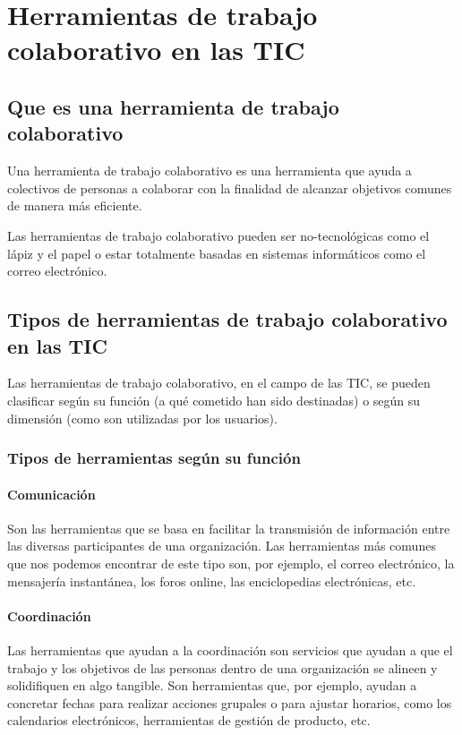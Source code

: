 \section{Herramientas de trabajo colaborativo en las TIC}

\subsection{Que es una herramienta de trabajo colaborativo}

Una herramienta de trabajo colaborativo es una herramienta que ayuda
a colectivos de personas a colaborar con la finalidad de alcanzar
objetivos comunes de manera más eficiente.

Las herramientas de trabajo colaborativo pueden ser no-tecnológicas
como el lápiz y el papel o estar totalmente basadas en sistemas
informáticos como el correo electrónico.

\subsection{Tipos de herramientas de trabajo colaborativo en las TIC} \label{ref:tool_types}

Las herramientas de trabajo colaborativo, en el campo de las TIC, se pueden
clasificar según su función (a qué cometido han sido destinadas) o según su
dimensión (como son utilizadas por los usuarios)\cite{ashley}.

\subsubsection{Tipos de herramientas según su función}

\paragraph{Comunicación}

Son las herramientas que se basa en facilitar la transmisión de información entre las diversas participantes de una organización. Las herramientas más comunes que nos podemos encontrar de este tipo son, por ejemplo, el correo electrónico, la mensajería instantánea, los foros online, las enciclopedias electrónicas, etc. 

\paragraph{Coordinación}

Las herramientas que ayudan a la coordinación son servicios que ayudan a que el trabajo y los objetivos de las personas dentro de una organización se alineen y solidifiquen en algo tangible. Son herramientas que, por ejemplo, ayudan a concretar fechas para realizar acciones grupales o para ajustar horarios, como los calendarios electrónicos, herramientas de gestión de producto, etc.

